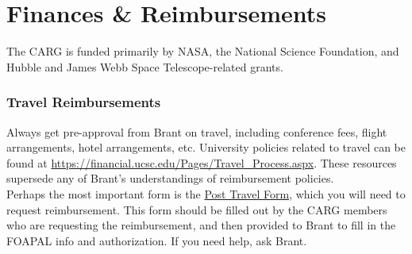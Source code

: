 \documentclass[fleqn,10pt]{wlscirep}
\begin{document}
\newpage
\section{Finances \& Reimbursements}
\label{sec:finances}

The CARG is funded primarily by
NASA,
the National Science Foundation,
and Hubble and James Webb Space
Telescope-related grants. 

\subsubsection{Travel Reimbursements}

Always get pre-approval from 
Brant on travel,
including conference fees,
flight arrangements, 
hotel arrangements, etc. 
University policies related to
travel can be found at \href{https://financial.ucsc.edu/Pages/Travel_Process.aspx}{https://financial.ucsc.edu/Pages/Travel\_Process.aspx}. These resources
supersede any of Brant's 
understandings of reimbursement
policies.\\

\noindent
Perhaps the most important form is the 
\href{https://financial.ucsc.edu/Financial_Affairs_Forms/Post_Travel_Expense.pdf}{Post Travel Form}, which
you will need to request reimbursement.
This form should be filled out by
the CARG members who are 
requesting the reimbursement, and
then provided to Brant to fill in
the FOAPAL info and authorization.
If you need help, ask Brant.




\end{document}
